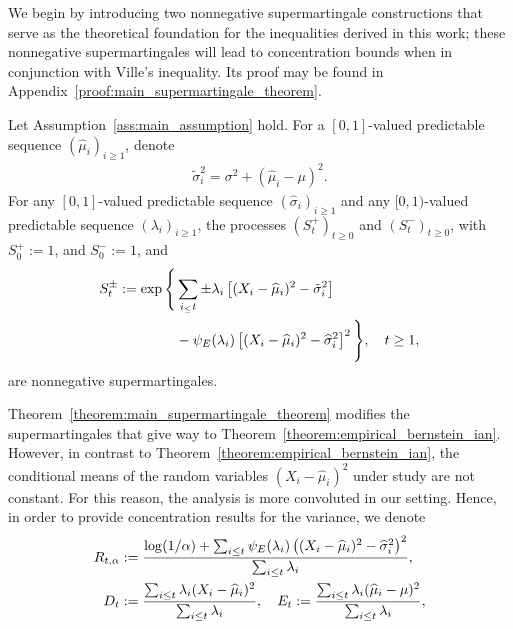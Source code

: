 We begin by introducing two nonnegative supermartingale constructions that serve as the theoretical foundation for the inequalities derived in this work; these nonnegative supermartingales will lead to concentration bounds when in conjunction with Ville's inequality.  Its proof may be found in Appendix~\ref{proof:main_supermartingale_theorem}.
\begin{theorem} \label{theorem:main_supermartingale_theorem}
    Let Assumption~\ref{ass:main_assumption} hold. For a $[0, 1]$-valued predictable sequence $(\widehat\mu_i)_{i \geq 1}$, denote
    \begin{align*}
        \tilde\sigma_i^2 = \sigma^2 + (\widehat\mu_i - \mu)^2.
    \end{align*}
    For any $[0, 1]$-valued predictable sequence  $(\widehat\sigma_i)_{i \geq 1}$ and any $[0, 1)$-valued predictable sequence  $(\lambda_i)_{i \geq 1}$, the processes $(S_t^+)_{t\geq0}$ and $(S_t^-)_{t\geq0}$, with $S_0^+ := 1$, and $S_0^- := 1$, and
    \begin{align*}
        S_t^{\pm} := \exp \Bigg\{ &\sum_{i_\leq t} \pm \lambda_i \left[  (X_i - \widehat\mu_i)^2 - \tilde\sigma_i^2  \right]
        \\ & - \psi_E(\lambda_i) \left[ (X_i - \widehat\mu_i)^2 - \widehat \sigma_i^2 \right]^2 \Bigg\}, \quad t\geq1,
    \end{align*}
    are nonnegative supermartingales.
\end{theorem}
Theorem~\ref{theorem:main_supermartingale_theorem} modifies the supermartingales that give way to Theorem~\ref{theorem:empirical_bernstein_ian}. However, in contrast to Theorem~\ref{theorem:empirical_bernstein_ian}, the conditional means of the random variables $(X_i - \widehat\mu_i)^2$ under study are not constant. For this reason, the analysis is more convoluted in our setting. Hence, in order to provide concentration results for the variance, we denote
\begin{align*}
    R_{t, \alpha} &:= \frac{\log(1/\alpha) + \sum_{i \leq t}\psi_E(\lambda_i) \left( (X_i - \widehat\mu_i)^2 - \widehat \sigma_i^2 \right)^2}{\sum_{i \leq t} \lambda_i},
    \\  D_t &:= \frac{\sum_{i \leq t}\lambda_i (X_i - \widehat\mu_i)^2}{\sum_{i \leq t} \lambda_i}, \quad E_t :=  \frac{\sum_{i \leq t} \lambda_i (\widehat\mu_i - \mu)^2}{\sum_{i \leq t} \lambda_i},
\end{align*}
